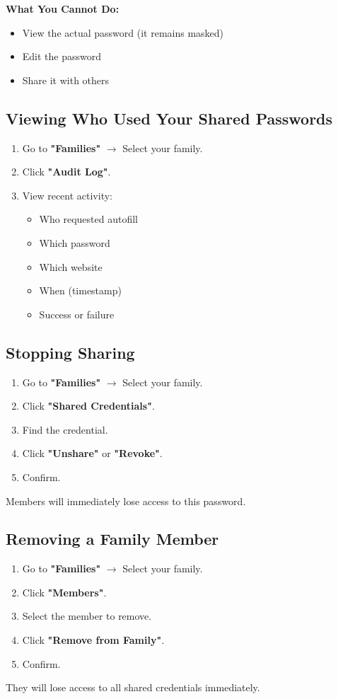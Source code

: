 \documentclass[11pt,a4paper]{article}
\begin{document}
\textbf{What You Cannot Do:}
\begin{itemize}
    \item View the actual password (it remains masked)
    \item Edit the password
    \item Share it with others
\end{itemize}

\subsection{Viewing Who Used Your Shared Passwords}
\begin{enumerate}
    \item Go to \textbf{"Families"} $\rightarrow$ Select your family.
    \item Click \textbf{"Audit Log"}.
    \item View recent activity:
    \begin{itemize}
        \item Who requested autofill
        \item Which password
        \item Which website
        \item When (timestamp)
        \item Success or failure
    \end{itemize}
\end{enumerate}

\subsection{Stopping Sharing}
\begin{enumerate}
    \item Go to \textbf{"Families"} $\rightarrow$ Select your family.
    \item Click \textbf{"Shared Credentials"}.
    \item Find the credential.
    \item Click \textbf{"Unshare"} or \textbf{"Revoke"}.
    \item Confirm.
\end{enumerate}
Members will immediately lose access to this password.

\subsection{Removing a Family Member}
\begin{enumerate}
    \item Go to \textbf{"Families"} $\rightarrow$ Select your family.
    \item Click \textbf{"Members"}.
    \item Select the member to remove.
    \item Click \textbf{"Remove from Family"}.
    \item Confirm.
\end{enumerate}
They will lose access to all shared credentials immediately.
\end{document}
